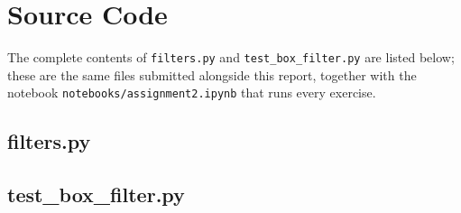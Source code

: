 \appendix
{}
%


\chapter{Source Code}
\label{app:source}

The complete contents of \texttt{filters.py} and
\texttt{test\_box\_filter.py} are listed below; these are the same files
submitted alongside this report, together with the notebook
\texttt{notebooks/assignment2.ipynb} that runs every exercise.

\section{filters.py}
\label{app:filterspy}



\section{test\_box\_filter.py}
\label{app:tests}


